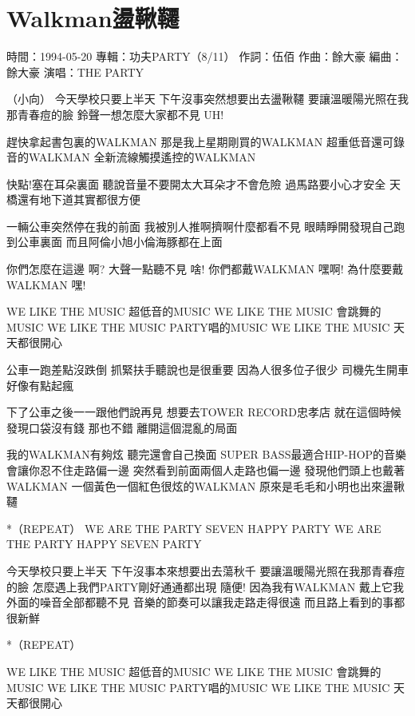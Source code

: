 \documentclass[UTF8,a4paper,oneside,twocolumn,12pt]{ctexbook}
\newcommand{\infopair}[2]{\textbullet #1：#2}
\newcommand{\zc}[1][伍佰]{\infopair{作詞}{#1}}
\newcommand{\zq}[1][伍佰]{\infopair{作曲}{#1}}
\newcommand{\bq}[1][伍佰]{\infopair{編曲}{#1}}
\newcommand{\zj}[1]{\infopair{專輯}{#1}}
\newcommand{\sj}[1]{\infopair{時間}{#1}}
\newenvironment{info}{\begin{flushleft}\kaishu
	}
	{\end{flushleft}\normalsize\yahei\par}
\newenvironment{lyric}{
	}
{}
\begin{document}
\section{Walkman盪鞦韆}
\begin{info}
	\sj{1994-05-20}
	\zj{功夫PARTY（8/11）}
	\zc
	\zq[餘大豪]
	\bq[餘大豪]
	\infopair{演唱}{THE PARTY}
\end{info}
\begin{lyric}
	（小向）
	今天學校只要上半天
	下午沒事突然想要出去盪鞦韆
	要讓溫暖陽光照在我那青春痘的臉
	鈴聲一想怎麼大家都不見 UH!

	趕快拿起書包裏的WALKMAN
	那是我上星期剛買的WALKMAN
	超重低音還可錄音的WALKMAN
	全新流線觸摸遙控的WALKMAN

	快點!塞在耳朵裏面 聽說音量不要開太大耳朵才不會危險
	過馬路要小心才安全 天橋還有地下道其實都很方便

	一輛公車突然停在我的前面
	我被別人推啊擠啊什麼都看不見
	眼睛睜開發現自己跑到公車裏面
	而且阿倫小旭小倫海豚都在上面

	你們怎麼在這邊 啊?
	大聲一點聽不見 啥!
	你們都戴WALKMAN 嘿啊!
	為什麼要戴WALKMAN 嘿!

	WE LIKE THE MUSIC 超低音的MUSIC
	WE LIKE THE MUSIC 會跳舞的MUSIC
	WE LIKE THE MUSIC PARTY唱的MUSIC
	WE LIKE THE MUSIC 天天都很開心

	公車一跑差點沒跌倒 抓緊扶手聽說也是很重要
	因為人很多位子很少 司機先生開車好像有點起瘋

	下了公車之後一一跟他們說再見
	想要去TOWER RECORD忠孝店
	就在這個時候發現口袋沒有錢 那也不錯
	離開這個混亂的局面

	我的WALKMAN有夠炫 聽完還會自己換面
	SUPER BASS最適合HIP-HOP的音樂
	會讓你忍不住走路偏一邊 突然看到前面兩個人走路也偏一邊
	發現他們頭上也戴著WALKMAN
	一個黃色一個紅色很炫的WALKMAN
	原來是毛毛和小明也出來盪鞦韆

	*（REPEAT）
	WE ARE THE PARTY
	SEVEN HAPPY PARTY
	WE ARE THE PARTY
	HAPPY SEVEN PARTY

	今天學校只要上半天
	下午沒事本來想要出去蕩秋千
	要讓溫暖陽光照在我那青春痘的臉
	怎麼遇上我們PARTY剛好通通都出現 隨便!
	因為我有WALKMAN
	戴上它我外面的噪音全部都聽不見
	音樂的節奏可以讓我走路走得很遠
	而且路上看到的事都很新鮮

	*（REPEAT）

	WE LIKE THE MUSIC 超低音的MUSIC
	WE LIKE THE MUSIC 會跳舞的MUSIC
	WE LIKE THE MUSIC PARTY唱的MUSIC
	WE LIKE THE MUSIC 天天都很開心
\end{lyric}
\end{document}
